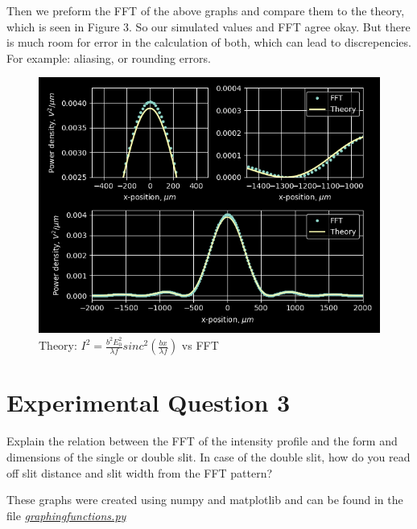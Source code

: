 \documentclass{article}
\begin{document}
Then we preform the FFT of the above graphs and compare them to the theory, which is seen in Figure 3. So our simulated values and FFT agree okay. But there is much room for error in the calculation of both, which can lead to discrepencies. For example: aliasing, or rounding errors.
\begin{figure}[h]
  \caption{Theory: $I^2 = \frac{b^2 E_0^2}{\lambda f} sinc^2(\frac{ bx}{\lambda f})$ vs FFT }
  \centering
  \includegraphics[scale=0.6]{thoeryvsnum.png}
\end{figure}

\section{Experimental Question 3}
Explain the relation between the FFT of the intensity profile and the form and dimensions of the single or double slit. In case of the double slit, how do you read off slit distance and slit width from the FFT pattern?

These graphs were created using numpy and matplotlib and can be found in the file \href{https://github.com/fusionby2030/Numerical_Methods/tree/master/Labs/017E/graphingfunctions.py}{\textit{graphingfunctions.py}}
\end{document}
